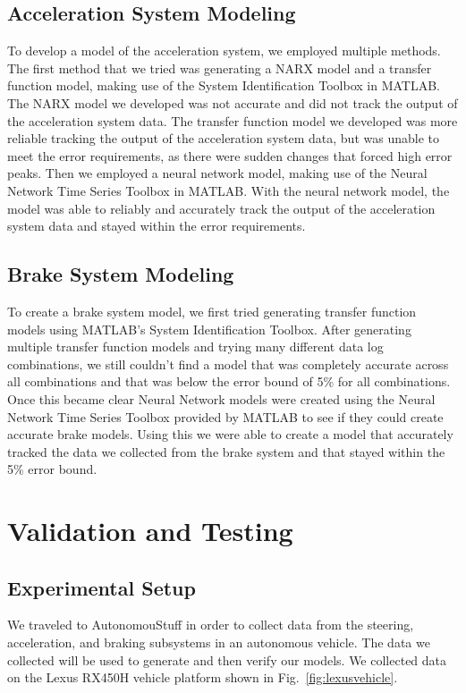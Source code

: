 \documentclass[journal,twoside,web]{ieeecolor}
\begin{document}
\subsection{Acceleration System Modeling}
To develop a model of the acceleration system, we employed multiple methods. The first method that we tried was generating a NARX model and a transfer function model, making use of the System Identification Toolbox in MATLAB. The NARX model we developed was not accurate and did not track the output of the acceleration system data. The transfer function model we developed was more reliable tracking the output of the acceleration system data, but was unable to meet the error requirements, as there were sudden changes that forced high error peaks. Then we employed a neural network model, making use of the Neural Network Time Series Toolbox in MATLAB. With the neural network model, the model was able to reliably and accurately track the output of the acceleration system data and stayed within the error requirements. 

\subsection{Brake System Modeling}
To create a brake system model, we first tried generating transfer function models using MATLAB’s System Identification Toolbox. After generating multiple transfer function models and trying many different data log combinations, we still couldn’t find a model that was completely accurate across all combinations and that was below the error bound of 5\% for all combinations. Once this became clear Neural Network models were created using the Neural Network Time Series Toolbox provided by MATLAB to see if they could create accurate brake models. Using this we were able to create a model that accurately tracked the data we collected from the brake system and that stayed within the 5\% error bound.  



\section{Validation and Testing} \label{sec:simresults}

\subsection{Experimental Setup}
\label{sec:experimentalSetup}

We traveled to AutonomouStuff in order to collect
data from the steering, acceleration, and braking subsystems in an autonomous
vehicle. The data we collected will be used to generate and then verify our
models. We collected data on the Lexus RX450H vehicle platform shown in
Fig.~\ref{fig:lexusvehicle}. %
\end{document}
